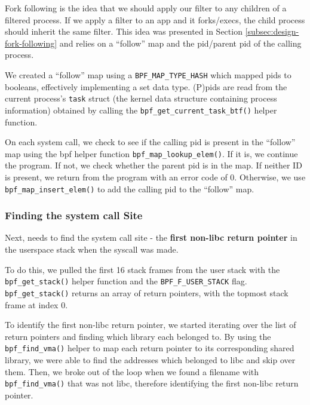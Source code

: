 Fork following is the idea that we should apply our filter to any children of a
filtered process. If we apply a filter to an app and it forks/execs,
the child process should inherit the same filter. This idea was
presented in Section \ref{subsec:design-fork-following} and relies
on a ``follow'' map and the \ac{pid}/parent \ac{pid} of the calling
process.

We created a ``follow'' map using a \texttt{BPF\_MAP\_TYPE\_HASH} which mapped
\ac{pid}s to booleans, effectively implementing a set data type. (P)\acp{pid}
are read from the current process's \texttt{task} struct (the kernel data
structure containing process information) obtained by calling the
\texttt{bpf\_get\_current\_task\_btf()} helper function. 

On each system call, we check to see if the calling \ac{pid} is present in the
``follow'' map using the \ac{bpf} helper function \texttt{bpf\_map\_lookup\_elem()}.
If it is, we continue the program. If not, we check whether
the parent \ac{pid} is in the map. If neither ID is present,
we return from the program with an error code of 0. Otherwise, we
use \texttt{bpf\_map\_insert\_elem()} to add the calling \ac{pid} to
the  ``follow'' map.

\subsubsection{Finding the system call Site}\label{subsec:impl-syscall-site}

Next, \af needs to find the system call site - the \textbf{first non-\ac{libc} return pointer} in the userspace stack when the syscall was made.

To do this, we pulled the first 16 stack frames from the user stack with the 
\texttt{bpf\_get\_stack()} helper function and the \texttt{BPF\_F\_USER\_STACK}
flag. \texttt{bpf\_get\_stack()} returns an array of return pointers, with the
topmost stack frame at index 0. 

To identify the first non-\ac{libc} return pointer, we started iterating over
the list of return pointers and finding which library each belonged to.
By using the \texttt{bpf\_find\_vma()} helper to map each return pointer to its
corresponding shared library, we were able to find the addresses which belonged
to \ac{libc} and skip over them. Then, we broke out of the loop when we found a
filename with \texttt{bpf\_find\_vma()} that was not \ac{libc}, therefore
identifying the first non-\ac{libc} return pointer.

